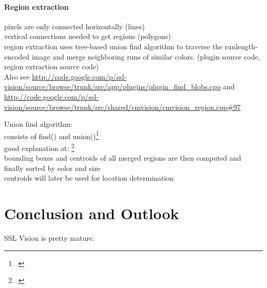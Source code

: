 \paragraph{Region extraction}

pixels are only connected horizontally (lines)\\
vertical connections needed to get regions (polygons)\\
region extraction uses tree-based union find algorithm to traverse the
runlength-encoded image and merge neighboring runs of similar colors. (plugin
source code, region extraction source code)\\



Also see
\url{http://code.google.com/p/ssl-vision/source/browse/trunk/src/app/plugins/plugin_find_blobs.cpp}
and 
\url{http://code.google.com/p/ssl-vision/source/browse/trunk/src/shared/cmvision/cmvision_region.cpp#97}

Union find algorithm:\\
consists of find() and union()\footcite[Cf.][]{sedgewick_union_find}\\
good explanation at:
\footcite[Cf.][]{wa_union_find} \\

bounding boxes and centroids of all merged regions are then computed and finally
sorted by color and size\\

centroids will later be used for location determination






\clearpage
\section{Conclusion and Outlook}
\label{sec:conclusion}
SSL Vision is pretty mature.




